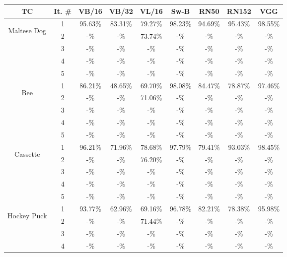 \begin{table}[h!]
\begin{tabular}{|c|c|ccccccc|}
\hline
TC & It. \# & VB/16 & VB/32 & VL/16 & Sw-B & RN50 & RN152 & VGG \\ \hline
\multirow{5}{*}{\begin{sideways}Maltese Dog\end{sideways}} & 1 & 95.63\% & 83.31\% & 79.27\% & 98.23\% & 94.69\% & 95.43\% & 98.55\% \\
 & 2 & -\% & -\% & 73.74\% & -\% & -\% & -\% & -\% \\
 & 3 & -\% & -\% & -\% & -\% & -\% & -\% & -\% \\
 & 4 & -\% & -\% & -\% & -\% & -\% & -\% & -\% \\
 & 5 & -\% & -\% & -\% & -\% & -\% & -\% & -\% \\
\hline
\multirow{5}{*}{\begin{sideways}Bee\end{sideways}} & 1 & 86.21\% & 48.65\% & 69.70\% & 98.08\% & 84.47\% & 78.87\% & 97.46\% \\
 & 2 & -\% & -\% & 71.06\% & -\% & -\% & -\% & -\% \\
 & 3 & -\% & -\% & -\% & -\% & -\% & -\% & -\% \\
 & 4 & -\% & -\% & -\% & -\% & -\% & -\% & -\% \\
 & 5 & -\% & -\% & -\% & -\% & -\% & -\% & -\% \\
\hline
\multirow{5}{*}{\begin{sideways}Cassette\end{sideways}} & 1 & 96.21\% & 71.96\% & 78.68\% & 97.79\% & 79.41\% & 93.03\% & 98.45\% \\
 & 2 & -\% & -\% & 76.20\% & -\% & -\% & -\% & -\% \\
 & 3 & -\% & -\% & -\% & -\% & -\% & -\% & -\% \\
 & 4 & -\% & -\% & -\% & -\% & -\% & -\% & -\% \\
 & 5 & -\% & -\% & -\% & -\% & -\% & -\% & -\% \\
\hline
\multirow{5}{*}{\begin{sideways}Hockey Puck\end{sideways}} & 1 & 93.77\% & 62.96\% & 69.16\% & 96.78\% & 82.21\% & 78.38\% & 95.98\% \\
 & 2 & -\% & -\% & 71.44\% & -\% & -\% & -\% & -\% \\
 & 3 & -\% & -\% & -\% & -\% & -\% & -\% & -\% \\
 & 4 & -\% & -\% & -\% & -\% & -\% & -\% & -\% \\

\end{tabular}
\end{table}
